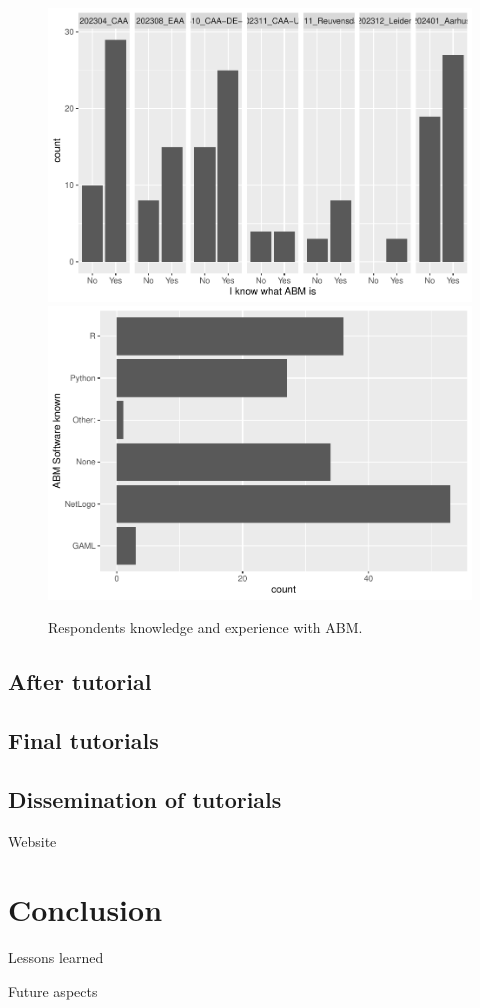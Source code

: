 \documentclass[
]{article}
\begin{document}
\begin{figure}
\includegraphics[width=0.5\linewidth]{paper_files/figure-latex/abm-knowledge-1} \includegraphics[width=0.5\linewidth]{paper_files/figure-latex/abm-knowledge-2} \caption{Respondents knowledge and experience with ABM.}\label{fig:abm-knowledge}
\end{figure}

\hypertarget{after-tutorial}{%
\subsection{After tutorial}\label{after-tutorial}}

\hypertarget{final-tutorials}{%
\subsection{Final tutorials}\label{final-tutorials}}

\hypertarget{dissemination-of-tutorials}{%
\subsection{Dissemination of
tutorials}\label{dissemination-of-tutorials}}

Website

\hypertarget{conclusion}{%
\section{Conclusion}\label{conclusion}}

Lessons learned

Future aspects
\end{document}
